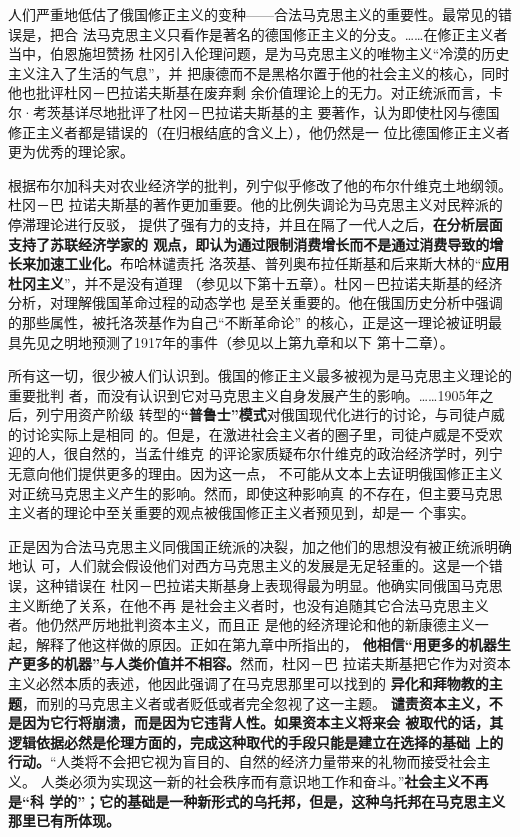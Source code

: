 人们严重地低估了俄国修正主义的变种——合法马克思主义的重要性。最常见的错误是，把合
法马克思主义只看作是著名的德国修正主义的分支。……在修正主义者当中，伯恩施坦赞扬
杜冈引入伦理问题，是为马克思主义的唯物主义“冷漠的历史主义注入了生活的气息”，并
把康德而不是黑格尔置于他的社会主义的核心，同时他也批评杜冈－巴拉诺夫斯基在废弃剩
余价值理论上的无力。对正统派而言，卡尔·考茨基详尽地批评了杜冈－巴拉诺夫斯基的主
要著作，认为即使杜冈与德国修正主义者都是错误的（在归根结底的含义上），他仍然是一
位比德国修正主义者更为优秀的理论家。

根据布尔加科夫对农业经济学的批判，列宁似乎修改了他的布尔什维克土地纲领。杜冈－巴
拉诺夫斯基的著作更加重要。他的比例失调论为马克思主义对民粹派的停滞理论进行反驳，
提供了强有力的支持，并且在隔了一代人之后，\textbf{在分析层面支持了苏联经济学家的
观点，即认为通过限制消费增长而不是通过消费导致的增长来加速工业化。}布哈林谴责托
洛茨基、普列奥布拉任斯基和后来斯大林的“\textbf{应用杜冈主义}”，并不是没有道理
（参见以下第十五章）。杜冈－巴拉诺夫斯基的经济分析，对理解俄国革命过程的动态学也
是至关重要的。他在俄国历史分析中强调的那些属性，被托洛茨基作为自己“不断革命论”
的核心，正是这一理论被证明最具先见之明地预测了1917年的事件（参见以上第九章和以下
第十二章）。

所有这一切，很少被人们认识到。俄国的修正主义最多被视为是马克思主义理论的重要批判
者，而没有认识到它对马克思主义自身发展产生的影响。……1905年之后，列宁用资产阶级
转型的\textbf{“普鲁士”模式}对俄国现代化进行的讨论，与司徒卢威的讨论实际上是相同
的。但是，在激进社会主义者的圈子里，司徒卢威是不受欢迎的人，很自然的，当孟什维克
的评论家质疑布尔什维克的政治经济学时，列宁无意向他们提供更多的理由。因为这一点，
不可能从文本上去证明俄国修正主义对正统马克思主义产生的影响。然而，即使这种影响真
的不存在，但主要马克思主义者的理论中至关重要的观点被俄国修正主义者预见到，却是一
个事实。

正是因为合法马克思主义同俄国正统派的决裂，加之他们的思想没有被正统派明确地认
可，人们就会假设他们对西方马克思主义的发展是无足轻重的。这是一个错误，这种错误在
杜冈－巴拉诺夫斯基身上表现得最为明显。他确实同俄国马克思主义断绝了关系，在他不再
是社会主义者时，也没有追随其它合法马克思主义者。他仍然严厉地批判资本主义，而且正
是他的经济理论和他的新康德主义一起，解释了他这样做的原因。正如在第九章中所指出的，
\textbf{他相信“用更多的机器生产更多的机器”与人类价值并不相容。}然而，杜冈－巴
拉诺夫斯基把它作为对资本主义必然本质的表述，他因此强调了在马克思那里可以找到的
\textbf{异化和拜物教的主题}，而别的马克思主义者或者贬低或者完全忽视了这一主题。
\textbf{谴责资本主义，不是因为它行将崩溃，而是因为它违背人性。如果资本主义将来会
被取代的话，其逻辑依据必然是伦理方面的，完成这种取代的手段只能是建立在选择的基础
上的行动。}“人类将不会把它视为盲目的、自然的经济力量带来的礼物而接受社会主义。
人类必须为实现这一新的社会秩序而有意识地工作和奋斗。”\textbf{社会主义不再是“科
学的”；它的基础是一种新形式的乌托邦，但是，这种乌托邦在马克思主义那里已有所体现。}

